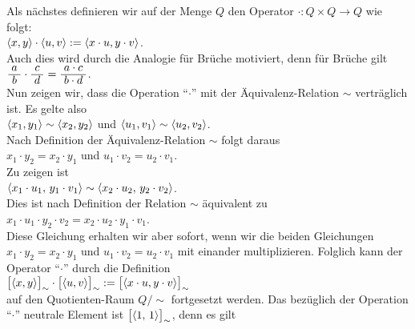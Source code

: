 \noindent
Als n\"{a}chstes definieren wir auf der Menge $Q$ den Operator $\cdot: Q \times Q \rightarrow Q$ wie folgt:
\\[0.2cm]
\hspace*{1.3cm}
$\pair(x,y) \cdot \pair(u,v) := \pair(x \cdot u, y \cdot v)$.
\\[0.2cm]
Auch dies wird durch die Analogie f\"{u}r Br\"{u}che motiviert, denn f\"{u}r Br\"{u}che gilt
\\[0.2cm]
\hspace*{1.3cm}
$\bruch{a}{b} \cdot \bruch{c}{d} = \bruch{a \cdot c}{b \cdot d}$.
\\[0.2cm]
Nun zeigen wir, dass die Operation ``$\cdot$'' mit der \"{A}quivalenz-Relation $\sim$ vertr\"{a}glich ist.
Es gelte also
\\[0.2cm]
\hspace*{1.3cm}
$\pair(x_1,y_1) \sim \pair(x_2,y_2)$ \quad und \quad
$\pair(u_1,v_1) \sim \pair(u_2,v_2)$.
\\[0.2cm]
Nach Definition der \"{A}quivalenz-Relation $\sim$ folgt daraus
\\[0.2cm]
\hspace*{1.3cm}
$x_1 \cdot y_2 = x_2 \cdot y_1$ \quad und \quad
$u_1 \cdot v_2 = u_2 \cdot v_1$.
\\[0.2cm]
Zu zeigen ist 
\\[0.2cm]
\hspace*{1.3cm}
$\pair(x_1 \cdot u_1,\, y_1 \cdot v_1) \sim  \pair(x_2 \cdot u_2,\, y_2 \cdot v_2)$.
\\[0.2cm]
Dies ist nach Definition der Relation $\sim$ \"{a}quivalent zu
\\[0.2cm]
\hspace*{1.3cm}
$x_1 \cdot u_1 \cdot y_2 \cdot v_2 = x_2 \cdot u_2 \cdot y_1 \cdot v_1$.
\\[0.2cm]
Diese Gleichung erhalten wir aber sofort, wenn wir die beiden Gleichungen
$x_1 \cdot y_2 = x_2 \cdot y_1$ und $u_1 \cdot v_2 = u_2 \cdot v_1$ mit einander multiplizieren.
Folglich kann der Operator ``$\cdot$'' durch die Definition
\\[0.2cm]
\hspace*{1.3cm}
$\bigl[\pair(x,y)\bigr]_\sim \cdot \bigl[\pair(u,v)\bigr]_\sim := 
 \bigl[\pair(x \cdot u, y \cdot v)\bigr]_\sim
$
\\[0.2cm]
auf den Quotienten-Raum $Q/\!\sim$ fortgesetzt werden.
Das bez\"{u}glich der Operation ``$\cdot$'' neutrale Element ist $\bigl[\pair(1,\,1)\bigr]_\sim$, denn es gilt
\\[0.2cm]
\hspace*{1.3cm}
